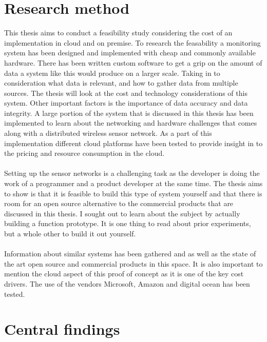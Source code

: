 \documentclass[]{uiophd}
\begin{document}
\section{Research method}
 This thesis aims to conduct a feasibility study considering the cost of an implementation in cloud and on premise. To research the feasability a monitoring system has been designed and implemented with cheap and commonly available hardware. There has been written custom software to get a grip on the amount of data a system like this would produce on a larger scale. Taking in to consideration what data is relevant, and how to gather data from multiple sources. The thesis will look at the cost and technology considerations of this system. Other important factors is the importance of data accuracy and data integrity. A large portion of the system that is discussed in this thesis has been implemented to learn about the networking and hardware challenges that comes along with a distributed wireless sensor network. As a part of this implementation different cloud platforms have been tested to provide insight in to the pricing and resource consumption in the cloud. 
\\\\
Setting up the sensor networks is a challenging task as the developer is doing the work of a programmer and a product developer at the same time. The thesis aims to show is that it is feasible to build this type of system yourself and that there is room for an open source alternative to the commercial products that are discussed in this thesis. I sought out to learn about the subject by actually building a function prototype. It is one thing to read about prior experiments, but a whole other to build it out yourself.
\\\\
Information about similar systems has been gathered and as well as the state of the art open source and commercial products in this space. It is also important to mention the cloud aspect of this proof of concept as it is one of the key cost drivers. The use of the vendors Microsoft, Amazon and digital ocean has been tested.

\section{Central findings}
\end{document}
